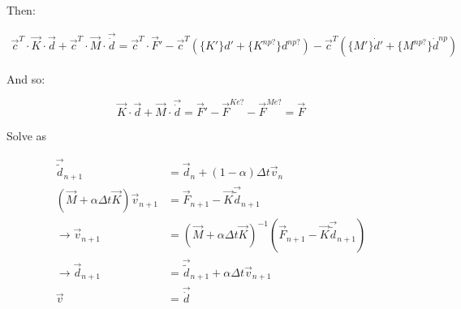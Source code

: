 Then:

\begin{equation}\label{solveeq1}
\begin{aligned}
\vec{c}^T\cdot\vec{K}\cdot\vec{d} + \vec{c}^T\cdot\vec{M}\cdot\vec{\dot{d}} = \vec{c}^T\cdot\vec{F}' - \vec{c}^T\left(
	\{K'\}d'
	+ \{K^{np?}\}d^{np?}
\right)
- \vec{c}^T \left(
	\{M'\}\dot{d}' + \{M^{np?}\}\dot{d}^{np}
\right)
\end{aligned}
\end{equation}


And so:

\begin{equation}\label{solveeq2}
\vec{K}\cdot\vec{d} + \vec{M}\cdot\vec{\dot{d}} = \vec{F}' - \vec{F}^{Ke?} - \vec{F}^{Me?} = \vec{F}
\end{equation}

Solve as

\begin{equation}\label{solveeq3}
\begin{aligned}
\vec{\tilde{d}}_{n+1} &= \vec{d}_n + (1-\alpha)\Delta t \vec{v}_n \\
(\vec{M} + \alpha\Delta t\vec{K})\vec{v}_{n+1} &= \vec{F}_{n+1} - \vec{K} \vec{\tilde{d}}_{n+1} \\
\rightarrow \vec{v}_{n+1} &= (\vec{M} + \alpha\Delta t \vec{K})^{-1} (\vec{F}_{n+1} - \vec{K} \vec{\tilde{d}}_{n+1}) \\
\rightarrow \vec{d}_{n+1} &= \vec{\tilde{d}}_{n+1} + \alpha\Delta t \vec{v}_{n+1} \\
\vec{v} &= \vec{\dot{d}}
\end{aligned}
\end{equation}